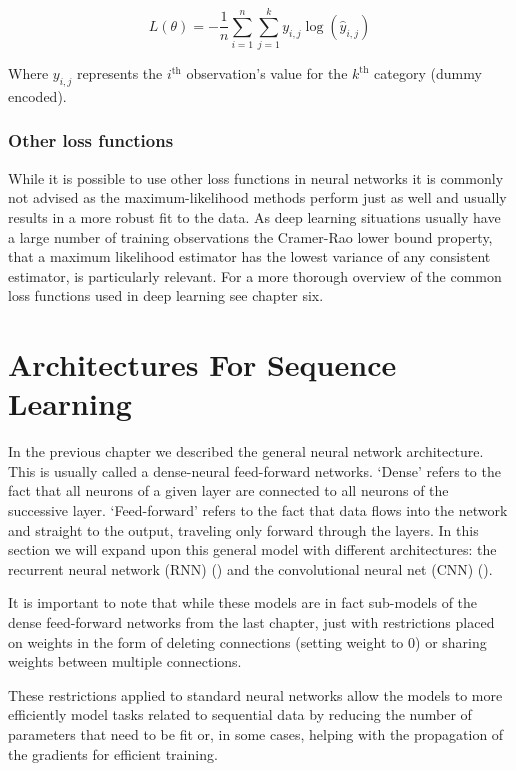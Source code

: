 \documentclass[]{book}
\theoremstyle{definition}
\theoremstyle{definition}
\theoremstyle{definition}
\theoremstyle{remark}
\let\BeginKnitrBlock\begin \let\EndKnitrBlock\end
\begin{document}
\BeginKnitrBlock{definition}[Categorical cross entropy loss]
\protect\hypertarget{def:catcrossentropy}{}{\label{def:catcrossentropy}
{}
}\[L(\theta) = -\frac{1}{n}\sum_{i = 1}^n\sum_{j = 1}^k y_{i,j}\log(\hat{y}_{i,j})\]

Where \(y_{i,j}\) represents the \(i^{\text{th}}\) observation's value
for the \(k^{\text{th}}\) category (dummy encoded).
\EndKnitrBlock{definition}

\subsection{Other loss functions}\label{other-loss-functions}

While it is possible to use other loss functions in neural networks it
is commonly not advised as the maximum-likelihood methods perform just
as well and usually results in a more robust fit to the data. As deep
learning situations usually have a large number of training observations
the Cramer-Rao lower bound property, that a maximum likelihood estimator
has the lowest variance of any consistent estimator, is particularly
relevant. For a more thorough overview of the common loss functions used
in deep learning see \citet{goodfellow_DL} chapter six.

\chapter{Architectures For Sequence Learning}\label{architectures}

In the previous chapter we described the general neural network
architecture. This is usually called a dense-neural feed-forward
networks. `Dense' refers to the fact that all neurons of a given layer
are connected to all neurons of the successive layer. `Feed-forward'
refers to the fact that data flows into the network and straight to the
output, traveling only forward through the layers. In this section we
will expand upon this general model with different architectures: the
recurrent neural network (RNN) (\citet{rnn_intro}) and the convolutional
neural net (CNN) (\citet{cnn_intro}).

It is important to note that while these models are in fact sub-models
of the dense feed-forward networks from the last chapter, just with
restrictions placed on weights in the form of deleting connections
(setting weight to 0) or sharing weights between multiple connections.

These restrictions applied to standard neural networks allow the models
to more efficiently model tasks related to sequential data by reducing
the number of parameters that need to be fit or, in some cases, helping
with the propagation of the gradients for efficient training.
\end{document}
